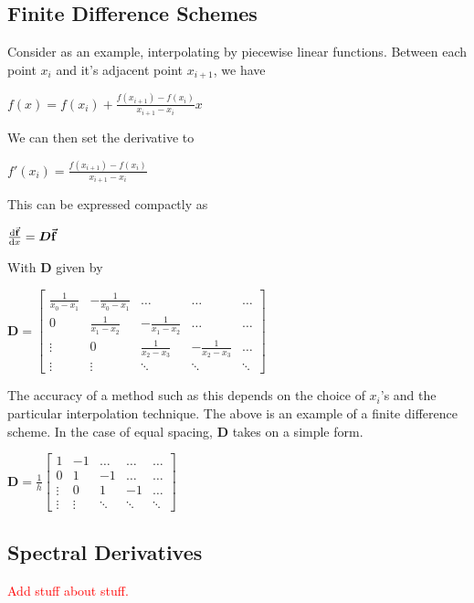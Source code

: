 \documentclass[12pt,letterpaper]{article}
\numberwithin{equation}{section}
\begin{document}
\subsection{Finite Difference Schemes}
Consider as an example, interpolating by piecewise linear functions. Between each point $x_i$ and it's adjacent point $x_{i+1}$, we have

\begin{center}
$f(x) = f(x_i) + \frac{f(x_{i+1}) - f(x_i)}{x_{i+1} - x_i}x$
\end{center}

\noindent We can then set the derivative to

\begin{center}
$f'(x_i) = \frac{f(x_{i+1}) - f(x_i)}{x_{i+1} - x_i}$
\end{center}

\noindent This can be expressed compactly as

\begin{center}
$\dv{\va{f}}{x} = \boldsymbol{D} \va{f}$
\end{center}

\noindent With $\boldsymbol{D}$ given by

\begin{center}
$
\boldsymbol{D}
=
\begin{bmatrix}
	\frac{1}{x_0 - x_1} & -\frac{1}{x_0 - x_1} & \dots & \dots & \dots \\ 
	0 & \frac{1}{x_1 - x_2} & -\frac{1}{x_1 - x_2} & \dots & \dots \\
	\vdots & 0 & \frac{1}{x_2 - x_3} & -\frac{1}{x_2 - x_3} & \dots \\
	\vdots & \vdots & \ddots & \ddots & \ddots
\end{bmatrix}
$
\end{center}

The accuracy of a method such as this depends on the choice of $x_i$'s and the particular interpolation technique. The above is an example of a finite difference scheme. In the case of equal spacing, $\boldsymbol{D}$ takes on a simple form.

\begin{center}
$
\boldsymbol{D}
= \frac{1}{h}
\begin{bmatrix}
	1 & -1 & \dots & \dots & \dots \\ 
	0 & 1 & -1 & \dots & \dots \\
	\vdots & 0 & 1 & -1 & \dots \\
	\vdots & \vdots & \ddots & \ddots & \ddots
\end{bmatrix}
$
\end{center}

\subsection{Spectral Derivatives}
\begin{center}
\textcolor{red}{Add stuff about stuff.}
\end{center}
\end{document}
